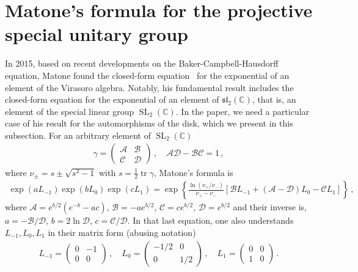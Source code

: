 \documentclass[aps,pre,reprint,longbibliography,superscriptaddress,noshowpacs,floatfix]{revtex4-2}
\theoremstyle{definition}
\theoremstyle{remark}
\DeclareMathOperator{\tr}{tr}
\DeclareMathOperator{\SL}{SL}
\begin{document}
\section{Matone's formula for the projective special unitary group}
\label{subsec:matone}
In 2015, based on recent developments on the Baker-Campbell-Hausdorff equation, Matone found the closed-form equation~\cite[(3.12) with (3.9)]{Matone2015} for the exponential of an element of the Virasoro algebra. Notably, his fundamental result includes the closed-form equation for the exponential of an element of $\mathfrak{sl}_2(\mathbb{C})$, that is, an element of the special linear group $\SL_2(\mathbb{C})$. In the paper, we need a particular case of his result for the automorphisms of the disk, which we present in this subsection. For an arbitrary element of $\SL_2(\mathbb{C})$
\begin{align*}
    \gamma = \begin{pmatrix}\mathcal{A}&\mathcal{B}\\\mathcal{C}&\mathcal{D}\end{pmatrix}\,,\quad \mathcal{A}\mathcal{D}- \mathcal{B}\mathcal{C} = 1\,,
\end{align*}
where $\nu_\pm = s \pm \sqrt{s^2 - 1}$ with $s = \frac{1}{2}\tr\gamma$, Matone's formula is
\begin{align*}
    \exp(a L_{-1})\exp(b L_0)\exp(c L_1) =\exp\left\{\frac{\ln(\nu_+/\nu_{-})}{\nu_+ - \nu_{-}}\left[\mathcal{B}L_{-1} + (\mathcal{A} - \mathcal{D})L_0 -\mathcal{C}L_1\right]\right\}\,,
\end{align*}
where $\mathcal{A} = e^{b/2}(e^{-b} - ac)$, $\mathcal{B} = -ae^{b/2}$, $\mathcal{C} = ce^{b/2}$, $\mathcal{D} = e^{b/2}$ and their inverse is, $a = -\mathcal{B}/\mathcal{D}$, $b = 2\ln \mathcal{D}$, $c = \mathcal{C}/\mathcal{D}$. In that last equation, one also understands $L_{-1}, L_0, L_1$ in their matrix form (abusing notation)
\begin{align*}
    L_{-1} = \begin{pmatrix}
        0 & -1 \\ 0 & 0
    \end{pmatrix}\,, \quad L_0 = \begin{pmatrix}
        -1/2 & 0 \\ 0 & 1/2
    \end{pmatrix}\,, \quad L_1 = \begin{pmatrix}
        0 & 0 \\
        1 & 0
    \end{pmatrix}
    \,.
\end{align*}
\end{document}
